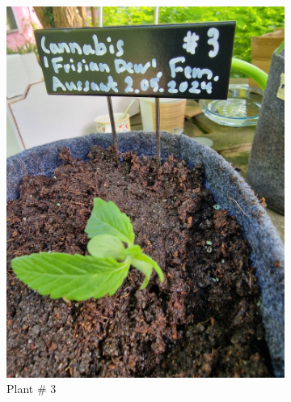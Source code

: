 \begin{figure}[htbp]
\begin{subfigure}[t]{.19\textwidth}
        \includegraphics[width=\linewidth]{plant_03_2024-05-13}
        \caption{Plant \# 3}
        \label{fig:plant_03_2024-05-13}
    \end{subfigure}
    \begin{subfigure}[t]{.19\textwidth}

\end{subfigure}
\end{figure}
